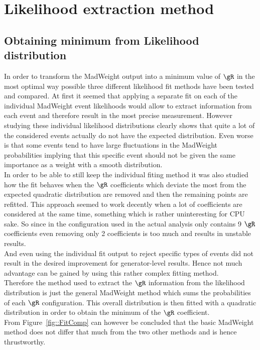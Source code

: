 \section{Likelihood extraction method} \label{sec::Method}
\subsection{Obtaining minimum from Likelihood distribution}
In order to transform the MadWeight output into a minimum value of $\gR$ in the most optimal way possible three different likelihood fit methods have been tested and compared. At first it seemed that applying a separate fit on each of the individual MadWeight event likelihoods would allow to extract information from each event and therefore result in the most precise measurement. However studying these individual likelihood distributions clearly shows that quite a lot of the considered events actually do not have the expected distribution. Even worse is that some events tend to have large fluctuations in the MadWeight probabilities implying that this specific event should not be given the same importance as a weight with a smooth distribution.
\\
In order to be able to still keep the individual fiting method it was also studied how the fit behaves when the $\gR$ coefficients which deviate the most from the expected quadratic distribution are removed and then the remaining points are refitted. This approach seemed to work decently when a lot of coefficients are considered at the same time, something which is rather uninteresting for CPU sake. So since in the configuration used in the actual analysis only contains 9 $\gR$ coefficients even removing only 2 coefficients is too much and results in unstable results.
\\
And even using the individual fit output to reject specific types of events did not result in the desired improvement for generator-level results. Hence not much advantage can be gained by using this rather complex fitting method.
\\

Therefore the method used to extract the $\gR$ information from the likelihood distribution is just the general MadWeight method which sums the probabilities of each $\gR$ configuration. This overall distribution is then fitted with a quadratic distribution in order to obtain the minimum of the $\gR$ coefficient.\\
From Figure~\ref{fig::FitComp} can however be concluded that the basic MadWeight method does not differ that much from the two other methods and is hence thrustworthy.

